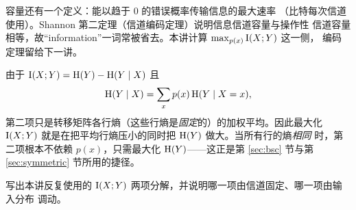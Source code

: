\begin{remark}
容量还有一个定义：能以趋于 $0$ 的错误概率传输信息的最大速率
（比特每次信道使用）。Shannon 第二定理（信道编码定理）说明信息信道容量与操作性
信道容量相等，故“information”一词常被省去。本讲计算 $\max_{p(x)}\mathrm{I}(X;Y)$ 这一侧，
编码定理留给下一讲。
\end{remark}


由于 $\mathrm{I}(X;Y)=\mathrm{H}(Y)-\mathrm{H}(Y\mid X)$ 且
\[
  \mathrm{H}(Y\mid X)=\sum_{x}p(x)\,\mathrm{H}(Y\mid X=x),
\]
第二项只是转移矩阵各行熵（这些行熵是\emph{固定}的）的加权平均。因此最大化
$\mathrm{I}(X;Y)$ 就是在把平均行熵压小的同时把 $\mathrm{H}(Y)$ 做大。当所有行的熵\emph{相同}
时，第二项根本不依赖 $p(x)$，只需最大化 $\mathrm{H}(Y)$——这正是第
\ref{sec:bsc} 节与第 \ref{sec:symmetric} 节所用的捷径。

\begin{yourturn}
写出本讲反复使用的 $\mathrm{I}(X;Y)$ 两项分解，并说明哪一项由信道固定、哪一项由输入分布
调动。
\ifshowanswers\else\workspace[2]\fi
{}
\end{yourturn}

